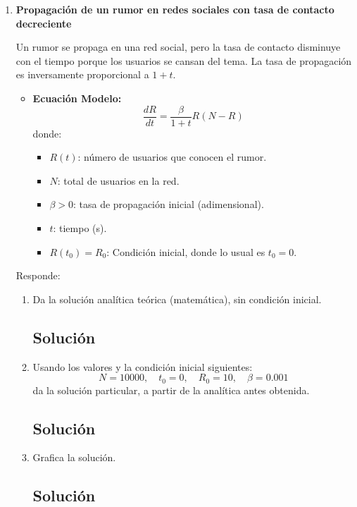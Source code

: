\begin{enumerate}[label=\arabic*., leftmargin=*]
    \item \textbf{Propagación de un rumor en redes sociales con tasa de contacto decreciente}

    Un rumor se propaga en una red social, pero la tasa de contacto disminuye con el tiempo porque los usuarios se cansan del tema. La tasa de propagación es inversamente proporcional a $1+t$.

    \begin{itemize}[leftmargin=*]
        \item \textbf{Ecuación Modelo:}
        \[ \frac{dR}{dt} = \frac{\beta}{1+t}R(N-R) \]
        donde:
        \begin{itemize}[leftmargin=*]
            \item $R(t)$: número de usuarios que conocen el rumor.
            \item $N$: total de usuarios en la red.
            \item $\beta > 0$: tasa de propagación inicial (adimensional).
            \item $t$: tiempo (s).
            \item $R(t_{0}) = R_{0}$: Condición inicial, donde lo usual es $t_{0}=0$.
        \end{itemize}
    \end{itemize}

    Responde:
    \begin{enumerate}[label=(\alph*), leftmargin=*]
        \item Da la solución analítica teórica (matemática), sin condición inicial.
        \subsection*{Solución}

        \item Usando los valores y la condición inicial siguientes:
        \[ N = 10000, \quad t_{0} = 0, \quad R_{0} = 10, \quad \beta = 0.001 \]
        da la solución particular, a partir de la analítica antes obtenida.
        \subsection*{Solución}

        \item Grafica la solución.
        \subsection*{Solución}


\end{enumerate}
\end{enumerate}
